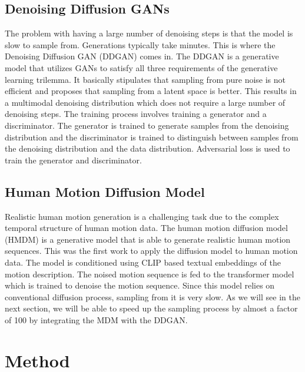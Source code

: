 \documentclass[10pt,twocolumn,letterpaper]{article}
\begin{document}
\subsection{Denoising Diffusion GANs}
The problem with having a large number of denoising steps is that the model is slow to sample from. Generations typically 
take minutes. This is where the Denoising Diffusion GAN (DDGAN) \cite{Xiao22} comes in. The DDGAN is a generative model that
utilizes GANs to satisfy all three requirements of the generative learning trilemma. It basically 
stipulates that sampling from pure noise is not efficient and proposes that sampling from a latent space is better.
This results in a multimodal denoising distribution which does not require a large number of denoising steps.
The training process involves training a generator and a discriminator. The generator is trained to generate samples from the
denoising distribution and the discriminator is trained to distinguish between samples from the denoising distribution and the
data distribution. Adversarial loss is used to train the generator and discriminator.

\subsection{Human Motion Diffusion Model}
Realistic human motion generation is a challenging task due to the complex temporal structure of human motion data.
The human motion diffusion model (HMDM) \cite{Tevet23} is a generative model that is able to generate realistic human motion sequences.
This was the first work to apply the diffusion model to human motion data. The model is conditioned using CLIP \cite{radford2021learning}
based textual embeddings of the motion description. The noised motion sequence is fed to the transformer model which
is trained to denoise the motion sequence. Since this model relies on conventional diffusion process,
sampling from it is very slow. As we will see in the next section, we will be able to speed up the sampling process
by almost a factor of 100 by integrating the MDM with the DDGAN.

\section{Method}
\label{sec:method}
\end{document}
